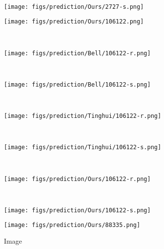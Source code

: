 \documentclass[10pt,twocolumn,letterpaper]{article}
\begin{document}
\begin{figure*}[ptb]
\begin{subfigure}[b]{0.135\textwidth}
    \end{subfigure}   \hspace*{-0.8em}
    ~    
    \begin{subfigure}[b]{0.135\textwidth}
        \texttt{[image: figs/prediction/Ours/2727-s.png]}
    \end{subfigure} 
	 \begin{subfigure}[b]{0.135\textwidth}
        \texttt{[image: figs/prediction/Ours/106122.png]}
    \end{subfigure} \hspace*{-0.8em}
    ~
    \begin{subfigure}[b]{0.135\textwidth}
        \texttt{[image: figs/prediction/Bell/106122-r.png]}
    \end{subfigure} \hspace*{-0.8em}
    ~
    \begin{subfigure}[b]{0.135\textwidth}
        \texttt{[image: figs/prediction/Bell/106122-s.png]}
    \end{subfigure} \hspace*{-0.8em}
    ~
    \begin{subfigure}[b]{0.135\textwidth}
        \texttt{[image: figs/prediction/Tinghui/106122-r.png]}
    \end{subfigure} \hspace*{-0.8em}
    ~    
    \begin{subfigure}[b]{0.135\textwidth}
        \texttt{[image: figs/prediction/Tinghui/106122-s.png]}
    \end{subfigure}   \hspace*{-0.8em}
    ~
    \begin{subfigure}[b]{0.135\textwidth}
        \texttt{[image: figs/prediction/Ours/106122-r.png]}
    \end{subfigure}   \hspace*{-0.8em}
    ~    
    \begin{subfigure}[b]{0.135\textwidth}
        \texttt{[image: figs/prediction/Ours/106122-s.png]}
    \end{subfigure}   
	 \begin{subfigure}[b]{0.135\textwidth}
        \texttt{[image: figs/prediction/Ours/88335.png]}
         \caption{Image}  \vspace{-0.1em}
    \end{subfigure} \hspace*{-0.8em}

\end{figure*}
\end{document}
